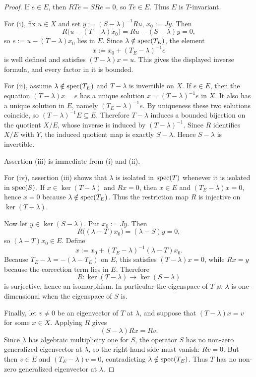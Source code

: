 \begin{proof}
If \(e\in E\), then \(RTe=SRe=0\), so \(Te\in E\).  Thus \(E\) is
\(T\)-invariant.

For (i), fix \(u\in X\) and set \(y:=(S-\lambda)^{-1}Ru\),
\(x_0:=Jy\).  Then
\[
  R\bigl(u-(T-\lambda)x_0\bigr)
  =
  Ru-(S-\lambda)y
  =
  0,
\]
so \(e:=u-(T-\lambda)x_0\) lies in \(E\).  Since
\(\lambda\notin\operatorname{spec}(T_E)\), the element
\[
  x:=x_0+(T_E-\lambda)^{-1}e
\]
is well defined and satisfies \((T-\lambda)x=u\).  This gives the
displayed inverse formula, and every factor in it is bounded.

For (ii), assume \(\lambda\notin\operatorname{spec}(T_E)\) and \(T-\lambda\) is
invertible on \(X\).  If \(e\in E\), then the equation
\((T-\lambda)x=e\) has a unique solution \(x=(T-\lambda)^{-1}e\) in
\(X\).  It also has a unique solution in \(E\), namely
\((T_E-\lambda)^{-1}e\).  By uniqueness these two solutions coincide, so
\((T-\lambda)^{-1}E\subseteq E\).  Therefore \(T-\lambda\) induces a
bounded bijection on the quotient \(X/E\), whose inverse is induced by
\((T-\lambda)^{-1}\).  Since \(R\) identifies \(X/E\) with \(Y\), the
induced quotient map is exactly \(S-\lambda\).  Hence \(S-\lambda\) is
invertible.

Assertion (iii) is immediate from (i) and (ii).

For (iv), assertion (iii) shows that \(\lambda\) is isolated in
\(\operatorname{spec}(T)\) whenever it is isolated in \(\operatorname{spec}(S)\).  If
\(x\in\ker(T-\lambda)\) and \(Rx=0\), then \(x\in E\) and
\((T_E-\lambda)x=0\), hence \(x=0\) because
\(\lambda\notin\operatorname{spec}(T_E)\).  Thus the restriction map \(R\) is
injective on \(\ker(T-\lambda)\).

Now let \(y\in\ker(S-\lambda)\).  Put \(x_0:=Jy\).  Then
\[
  R\bigl((\lambda-T)x_0\bigr)
  =
  (\lambda-S)y
  =
  0,
\]
so \((\lambda-T)x_0\in E\).  Define
\[
  x:=x_0+(T_E-\lambda)^{-1}(\lambda-T)x_0 .
\]
Because \(T_E-\lambda=-(\lambda-T_E)\) on \(E\), this satisfies
\((T-\lambda)x=0\), while \(Rx=y\) because the correction term lies in
\(E\).  Therefore
\[
  R:\ker(T-\lambda)\longrightarrow\ker(S-\lambda)
\]
is surjective, hence an isomorphism.  In particular the eigenspace of
\(T\) at \(\lambda\) is one-dimensional when the eigenspace of \(S\) is.

Finally, let \(v\neq0\) be an eigenvector of \(T\) at \(\lambda\), and
suppose that \((T-\lambda)x=v\) for some \(x\in X\).  Applying \(R\)
gives
\[
  (S-\lambda)Rx=Rv .
\]
Since \(\lambda\) has algebraic multiplicity one for \(S\), the operator
\(S\) has no non-zero generalized eigenvector at \(\lambda\), so the
right-hand side must vanish: \(Rv=0\).  But then \(v\in E\) and
\((T_E-\lambda)v=0\), contradicting \(\lambda\notin\operatorname{spec}(T_E)\).  Thus
\(T\) has no non-zero generalized eigenvector at \(\lambda\).
\end{proof}

